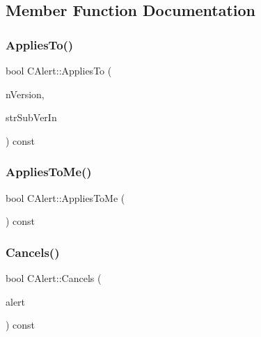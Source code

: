 \subsection{Member Function Documentation}
\mbox{\label{class_c_alert_a9e6ab19be3dc74242c2f535c3803ca96}} 
\subsubsection{\texorpdfstring{Applies\+To()}{AppliesTo()}}
{\footnotesize\ttfamily bool C\+Alert\+::\+Applies\+To (\begin{DoxyParamCaption}\item[{int}]{n\+Version,  }\item[{const std\+::string \&}]{str\+Sub\+Ver\+In }\end{DoxyParamCaption}) const}

\mbox{\label{class_c_alert_aba79cc9e957446fe93f05cb18f12b24b}} 
\subsubsection{\texorpdfstring{Applies\+To\+Me()}{AppliesToMe()}}
{\footnotesize\ttfamily bool C\+Alert\+::\+Applies\+To\+Me (\begin{DoxyParamCaption}{ }\end{DoxyParamCaption}) const}

\mbox{\label{class_c_alert_a75777afd3418c6cd74f7e9e4caed3472}} 
\subsubsection{\texorpdfstring{Cancels()}{Cancels()}}
{\footnotesize\ttfamily bool C\+Alert\+::\+Cancels (\begin{DoxyParamCaption}\item[{const \mbox{\hyperlink{class_c_alert}{C\+Alert}} \&}]{alert }\end{DoxyParamCaption}) const}

\mbox{\label{class_c_alert_a07fea34252a3ef5b291237641caa7203}} 
